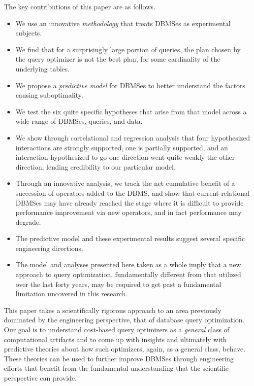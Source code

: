 \documentclass[prodmode,acmtods]{acmsmall}
\begin{document}
\pagebreak
The key contributions of this paper are as follows.
\begin{itemize} 
\item We use an innovative {\em methodology} that treats \hbox{DBMSes} as experimental subjects.

\item We find that for a surprisingly large portion of queries, the plan
  chosen  by the query optimizer is not the best plan, for some cardinality
  of the underlying tables.

\item We propose a {\em predictive model} for \hbox{DBMSes} to better
  understand the factors causing suboptimality.

\item We test the six quite specific hypotheses that arise from that
  model across a wide range of DBMSes, queries, and data.

\item We show through correlational and regression analysis that four
  hypothesized interactions are strongly supported, one is partially supported, and
  an interaction hypothesized to go one direction went quite weakly the
  other direction, lending credibility to our particular model.

\item Through an innovative
  analysis, we track the net cumulative benefit of a succession of operators
  added to the DBMS, and show that current relational DBMSes may have
  already reached the stage where it is difficult to provide performance
  improvement via new operators, and in fact performance may degrade.

\item The predictive model and these experimental results suggest several specific
  engineering directions.

\item The model and analyses presented here taken as a whole imply that a
  new approach to query optimization, fundamentally
  different from that utilized over the last forty years, may be required
  to get past a fundamental limitation uncovered in this research.
\end{itemize}

This paper takes a scientifically rigorous approach to an
area previously dominated by the engineering perspective, that of database
query optimization.  Our goal is to \hbox{understand} cost-based query optimizers
as a {\em general} class of computational artifacts and to come up with
insights and ultimately with predictive theories about how such optimizers,
again, as a general class, behave.  These theories can be used to further
improve \hbox{DBMSes} through engineering \hbox{efforts} that benefit from the fundamental
understanding that the scientific perspective can provide.
\end{document}

